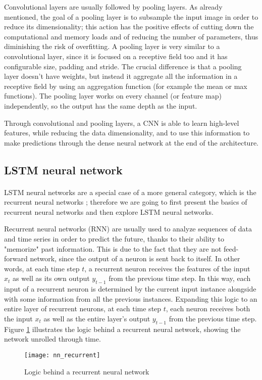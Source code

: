 Convolutional layers are usually followed by pooling layers. As already mentioned, the goal of a pooling layer is to subsample the input image in order to reduce its dimensionality; this action has the positive effects of cutting down the computational and memory loads and of reducing the number of parameters, thus diminishing the risk of overfitting. A pooling layer is very similar to a convolutional layer, since it is focused on a receptive field too and it has configurable size, padding and stride. The crucial difference is that a pooling layer doesn't have weights, but instead it aggregate all the information in a receptive field by using an aggregation function (for example the mean or max functions). The pooling layer works on every channel (or feature map) independently, so the output has the same depth as the input.

Through convolutional and pooling layers, a CNN is able to learn high-level features, while reducing the data dimensionality, and to use this information to make predictions through the dense neural network at the end of the architecture.




\subsection{LSTM neural network}
\paragraph{} LSTM neural networks are a special case of a more general category, which is the recurrent neural networks \cite{OReilly:handsonML}; therefore we are going to first present the basics of recurrent neural networks and then explore LSTM neural networks.

Recurrent neural networks (RNN) are usually used to analyze sequences of data and time series in order to predict the future, thanks to their ability to "memorize" past information. This is due to the fact that they are not feed-forward network, since the output of a neuron is sent back to itself. In other words, at each time step $t$, a recurrent neuron receives the features of the input $x_t$ as well as its own output $y_{t-1}$ from the previous time step. In this way, each input of a recurrent neuron is determined by the current input instance alongside with some information from all the previous instances. Expanding this logic to an entire layer of recurrent neurons, at each time step $t$, each neuron receives both the input $x_t$ as well as the entire layer's output $y_{t-1}$ from the previous time step. Figure \ref{fig:nn_recurrent} illustrates the logic behind a recurrent neural network, showing the network unrolled through time.
\begin{figure}[t]
    \centering
    \texttt{[image: nn\_recurrent]}
    \caption{Logic behind a recurrent neural network}
    \label{fig:nn_recurrent}
\end{figure}

